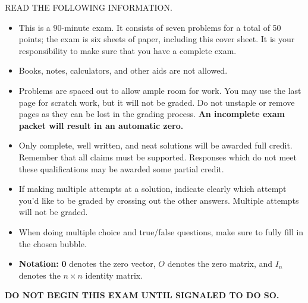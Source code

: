 \documentclass[12pt]{extarticle}
\begin{document}
READ THE FOLLOWING INFORMATION.
\begin{itemize}
    \item This is a 90-minute exam. It consists of seven problems for a total of 50 points; the exam is six sheets of paper, including this cover sheet. It is your responsibility to make sure that you have a complete exam.
    \item Books, notes, calculators, and other aids are not allowed.\vspace{-.1in}
    \item Problems are spaced out to allow ample room for work. You may use the last page for scratch work, but it will not be graded. Do not unstaple or remove pages as they can be lost in the grading process.  \textbf{An incomplete exam packet will result in an automatic zero.}  \vspace{-.1in}
    \item Only complete, well written, and neat solutions will be awarded full credit. Remember that all claims must be supported. Responses which do not meet these qualifications may be awarded some partial credit.\vspace{-.1in}
 \item  If making multiple attempts at a solution, indicate clearly which attempt you'd like to be graded by crossing out the other answers. Multiple attempts will not be graded.
 
 \vspace{-0.2cm} 
\item When doing multiple choice and true/false questions, make sure to fully fill in the chosen bubble.


 \vspace{-0.2cm} 
 
  \item \textbf{Notation:} $\mathbf{0}$ denotes the zero vector, $O$ denotes the zero matrix, and $I_n$ denotes the $n\times n$ identity matrix.
\end{itemize}

\bigskip

\textbf{DO NOT BEGIN THIS EXAM UNTIL SIGNALED TO DO SO.}



\newpage
\end{document}
